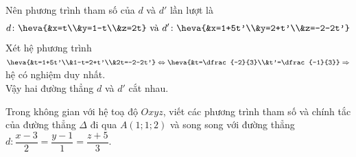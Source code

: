 \begin{bt}
\begin{listEX}
{\begin{listEX}
				Nên phương trình tham số  của $d$ và $d'$ lần lượt là
				$$d \colon \heva{&x=t\\&y=1-t\\&z=2t}\text{ và }d' \colon \heva{&x=1+5t'\\&y=2+t'\\&z=-2-2t'}$$ 
				Xét hệ phương trình $\heva{&t=1+5t'\\&1-t=2+t'\\&2t=-2-2t'}\Leftrightarrow\heva{&t=\dfrac{-2}{3}\\&t'=\dfrac{-1}{3}}\Rightarrow$  hệ có nghiệm duy nhất.\\
				Vậy hai đường thẳng $d$  và $d'$ cắt nhau.
			\end{listEX}
		} 
	\end{listEX}
\end{bt}

\begin{bt}%
	Trong không gian với hệ toạ độ $Oxyz$, viết các  phương trình tham số và chính tắc của đường thẳng $\Delta$ đi qua $A(1;1;2)$ và song song với đường thẳng $d \colon \dfrac{x-3}{2}=\dfrac{y-1}{1}=\dfrac{z+5}{3}$.
\end{bt}

